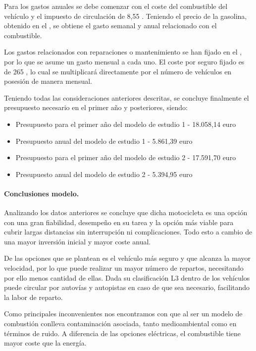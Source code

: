 Para los gastos anuales se debe comenzar con el coste del combustible del vehículo y el impuesto de circulación de 8,55 . Teniendo el precio de la gasolina, obtenido en el , se obtiene el gasto semanal y anual relacionado con el combustible. 

Los gastos relacionados con reparaciones o mantenimiento se han fijado en el , por lo que se asume un gasto mensual a cada uno.
El coste por seguro fijado es de 265 , lo cual se multiplicará directamente por el número de vehículos en posesión de manera mensual.

Teniendo todas las consideraciones anteriores descritas, se concluye finalmente el presupuesto necesario en el primer año y posteriores, siendo:

\begin{itemize}
    \item Presupuesto para el primer año del modelo de estudio 1 - 18.058,14 \gls{euro}
    \item Presupuesto anual del modelo de estudio 1 - 5.861,39 \gls{euro}
    \item Presupuesto para el primer año del modelo de estudio 2 - 17.591,70 \gls{euro}
    \item Presupuesto anual del modelo de estudio 2 - 5.394,95 \gls{euro}
\end{itemize}
\paragraph{Conclusiones modelo.}

Analizando los datos anteriores se concluye que dicha motocicleta es una opción con una gran fiabilidad, desempeño en su tarea y la opción más viable para cubrir largas distancias sin interrupción ni complicaciones. Todo esto a cambio de una mayor inversión inicial y mayor coste anual.

De las opciones que se plantean es el vehículo más seguro y que alcanza la mayor velocidad, por lo que puede realizar un mayor número de repartos, necesitando por ello menos cantidad de ellas. Dada su clasificación L3 dentro de los vehículos puede circular por autovías y autopistas en caso de que sea necesario, facilitando la labor de reparto.

Como principales inconvenientes nos encontramos con que al ser un modelo de combustión conlleva contaminación asociada, tanto medioambiental como en términos de ruido. A diferencia de las opciones eléctricas, el combustible tiene mayor coste que la energía.